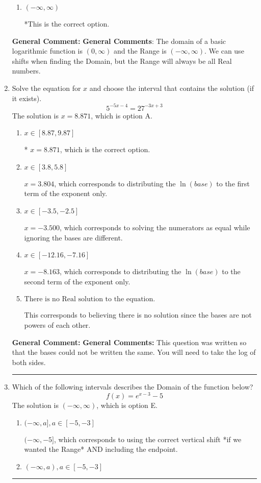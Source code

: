 \documentclass{extbook}[14pt]
\newcommand{\litem}[1]{\item #1

\rule{\textwidth}{0.4pt}}
\begin{document}
\begin{enumerate}
{\begin{enumerate}[label=\Alph*.]
$(-\infty, -2)$, which corresponds to using the using the negative of vertical shift on $(0, \infty)$.
\item \( (-\infty, \infty) \)

*This is the correct option.
\end{enumerate}

\textbf{General Comment:} \textbf{General Comments}: The domain of a basic logarithmic function is $(0, \infty)$ and the Range is $(-\infty, \infty)$. We can use shifts when finding the Domain, but the Range will always be all Real numbers.
}
\litem{
Solve the equation for $x$ and choose the interval that contains the solution (if it exists).
\[ 5^{-5x-4} = 27^{-3x+3} \]The solution is \( x = 8.871 \), which is option A.\begin{enumerate}[label=\Alph*.]
\item \( x \in [8.87, 9.87] \)

* $x = 8.871$, which is the correct option.
\item \( x \in [3.8, 5.8] \)

$x = 3.804$, which corresponds to distributing the $\ln(base)$ to the first term of the exponent only.
\item \( x \in [-3.5, -2.5] \)

$x = -3.500$, which corresponds to solving the numerators as equal while ignoring the bases are different.
\item \( x \in [-12.16, -7.16] \)

$x = -8.163$, which corresponds to distributing the $\ln(base)$ to the second term of the exponent only.
\item \( \text{There is no Real solution to the equation.} \)

This corresponds to believing there is no solution since the bases are not powers of each other.
\end{enumerate}

\textbf{General Comment:} \textbf{General Comments:} This question was written so that the bases could not be written the same. You will need to take the log of both sides.
}
\litem{
Which of the following intervals describes the Domain of the function below?
\[ f(x) = e^{x-3}-5 \]The solution is \( (-\infty, \infty) \), which is option E.\begin{enumerate}[label=\Alph*.]
\item \( (-\infty, a], a \in [-5, -3] \)

$(-\infty, -5]$, which corresponds to using the correct vertical shift *if we wanted the Range* AND including the endpoint.
\item \( (-\infty, a), a \in [-5, -3] \)


\end{enumerate}}
\end{enumerate}
\end{document}

